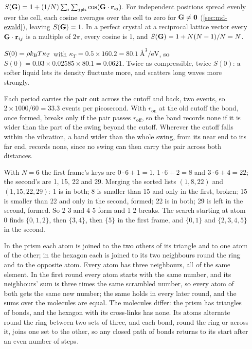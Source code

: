 $S(\bm{\mathrm{G}}) = 1 + (1/N)\sum_i\sum_{j\neq
i}\cos(\bm{\mathrm{G}}\cdot\bm{\mathrm{r}}_{ij})$. For independent positions spread evenly
over the cell, each cosine averages over the cell to zero for $\bm{\mathrm{G}}
\neq \bm{\mathrm{0}}$ (\cref{sec:md-ewald}), leaving $S(\bm{\mathrm{G}}) = 1$. In a perfect
crystal at a reciprocal lattice vector every $\bm{\mathrm{G}}\cdot\bm{\mathrm{r}}_{ij}$ is a
multiple of $2\pi$, every cosine is 1, and $S(\bm{\mathrm{G}}) = 1 + N(N - 1)/N =
N$.

$S(0) = \rho k_{\mathrm{B}} T\kappa_T$ with $\kappa_T = 0.5
\times160.2 = \SI{80.1}{\angstrom\cubed\per\electronvolt}$, so $S(0) = 0.03
\times0.02585\times80.1 = 0.0621$. Twice as compressible, twice $S(0)$: a
softer liquid lets its density fluctuate more, and scatters long waves
more strongly.

Each period carries the pair out across the
cutoff and back, two events, so $2\times1000/60 = 33.3$ events per
picosecond. With $r_{\mathrm{on}}$ at the old cutoff the bond, once
formed, breaks only if the pair passes $r_{\mathrm{off}}$, so the band
records none if it is wider than the part of the swing beyond the
cutoff. Wherever the cutoff falls within the vibration, a band wider
than the whole swing, from its near end to its far end, records none,
since no swing can then carry the pair across both distances.

With $N = 6$ the first frame's keys are $0\cdot6 + 1
= 1$, $1\cdot6 + 2 = 8$ and $3\cdot6 + 4 = 22$; the second's are 1, 15,
22 and 29. Merging the sorted lists $(1, 8, 22)$ and $(1, 15, 22, 29)$:
1 is in both; 8 is smaller than 15 and only in the first, broken; 15 is
smaller than 22 and only in the second, formed; 22 is in both; 29 is left
in the second, formed. So 2-3 and 4-5 form and 1-2 breaks. The search
starting at atom 0 finds $\{0, 1, 2\}$, then $\{3, 4\}$, then $\{5\}$ in
the first frame, and $\{0, 1\}$ and $\{2, 3, 4, 5\}$ in the second.

In the prism each atom is joined to the two others
of its triangle and to one atom of the other; in the hexagon each is
joined to its two neighbours round the ring and to the opposite atom.
Every atom has three neighbours, all of the same element. In the first
round every atom starts with the same number, and its neighbours' sum is
three times the same scrambled number, so every atom of both gets the
same new number; the same holds in every later round, and the sums over
the molecules are equal. The molecules differ: the prism has triangles of
bonds, and the hexagon with its cross-links has none. Its atoms alternate
round the ring between two sets of three, and each bond, round the ring
or across it, joins one set to the other, so any closed path of bonds
returns to its start after an even number of steps.

